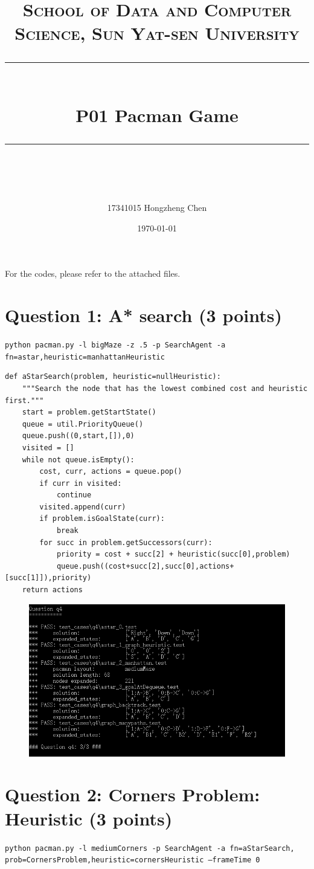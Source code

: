 \documentclass[a4paper, 11pt]{article}
\title{
\normalfont \normalsize
\textsc{School of Data and Computer Science, Sun Yat-sen University} \\ [25pt] %
\rule{\textwidth}{0.5pt} \\[0.4cm] %
\huge  P01 Pacman Game \\ %
\rule{\textwidth}{2pt} \\[0.5cm] %
\author{17341015 Hongzheng Chen}
\date{\normalsize\today}
}
\begin{document}
\maketitle
\tableofcontents
\newpage

For the codes, please refer to the attached files.

\section{Question 1: A* search (3 points)}
\texttt{python pacman.py -l bigMaze -z .5 -p SearchAgent -a fn=astar,heuristic=manhattanHeuristic}

\begin{lstlisting}
def aStarSearch(problem, heuristic=nullHeuristic):
    """Search the node that has the lowest combined cost and heuristic first."""
    start = problem.getStartState()
    queue = util.PriorityQueue()
    queue.push((0,start,[]),0)
    visited = []
    while not queue.isEmpty():
        cost, curr, actions = queue.pop()
        if curr in visited:
            continue
        visited.append(curr)
        if problem.isGoalState(curr):
            break
        for succ in problem.getSuccessors(curr):
            priority = cost + succ[2] + heuristic(succ[0],problem)
            queue.push((cost+succ[2],succ[0],actions+[succ[1]]),priority)
    return actions
\end{lstlisting}

\begin{figure}[H]
  \centering
  \includegraphics[width=\linewidth]{fig/Q1.png}
\end{figure}

\section{Question 2: Corners Problem: Heuristic (3 points)}
\texttt{python pacman.py -l mediumCorners -p SearchAgent -a fn=aStarSearch,\\prob=CornersProblem,heuristic=cornersHeuristic --frameTime 0}
\end{document}
